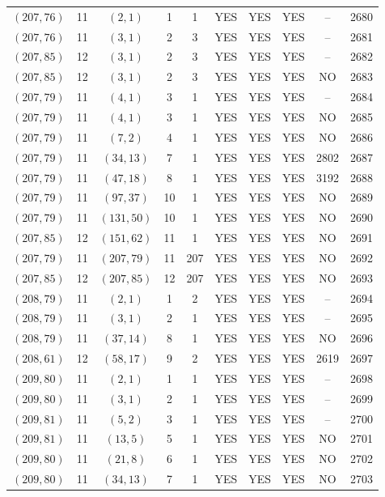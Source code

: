 \begin{longtable}{|c|c|c|c|c|c|c|c|c|c|}
$(207, 76)$ & 11 & $(2, 1)$ & 1 & 1 & YES & YES & YES & -- & 2680\\
$(207, 76)$ & 11 & $(3, 1)$ & 2 & 3 & YES & YES & YES & -- & 2681\\
$(207, 85)$ & 12 & $(3, 1)$ & 2 & 3 & YES & YES & YES & -- & 2682\\
$(207, 85)$ & 12 & $(3, 1)$ & 2 & 3 & YES & YES & YES & NO & 2683\\
$(207, 79)$ & 11 & $(4, 1)$ & 3 & 1 & YES & YES & YES & -- & 2684\\
$(207, 79)$ & 11 & $(4, 1)$ & 3 & 1 & YES & YES & YES & NO & 2685\\
$(207, 79)$ & 11 & $(7, 2)$ & 4 & 1 & YES & YES & YES & NO & 2686\\
$(207, 79)$ & 11 & $(34, 13)$ & 7 & 1 & YES & YES & YES & 2802 & 2687\\
$(207, 79)$ & 11 & $(47, 18)$ & 8 & 1 & YES & YES & YES & 3192 & 2688\\
$(207, 79)$ & 11 & $(97, 37)$ & 10 & 1 & YES & YES & YES & NO & 2689\\
$(207, 79)$ & 11 & $(131, 50)$ & 10 & 1 & YES & YES & YES & NO & 2690\\
$(207, 85)$ & 12 & $(151, 62)$ & 11 & 1 & YES & YES & YES & NO & 2691\\
$(207, 79)$ & 11 & $(207, 79)$ & 11 & 207 & YES & YES & YES & NO & 2692\\
$(207, 85)$ & 12 & $(207, 85)$ & 12 & 207 & YES & YES & YES & NO & 2693\\
$(208, 79)$ & 11 & $(2, 1)$ & 1 & 2 & YES & YES & YES & -- & 2694\\
$(208, 79)$ & 11 & $(3, 1)$ & 2 & 1 & YES & YES & YES & -- & 2695\\
$(208, 79)$ & 11 & $(37, 14)$ & 8 & 1 & YES & YES & YES & NO & 2696\\
$(208, 61)$ & 12 & $(58, 17)$ & 9 & 2 & YES & YES & YES & 2619 & 2697\\
$(209, 80)$ & 11 & $(2, 1)$ & 1 & 1 & YES & YES & YES & -- & 2698\\
$(209, 80)$ & 11 & $(3, 1)$ & 2 & 1 & YES & YES & YES & -- & 2699\\
$(209, 81)$ & 11 & $(5, 2)$ & 3 & 1 & YES & YES & YES & -- & 2700\\
$(209, 81)$ & 11 & $(13, 5)$ & 5 & 1 & YES & YES & YES & NO & 2701\\
$(209, 80)$ & 11 & $(21, 8)$ & 6 & 1 & YES & YES & YES & NO & 2702\\
$(209, 80)$ & 11 & $(34, 13)$ & 7 & 1 & YES & YES & YES & NO & 2703\\

\end{longtable}
